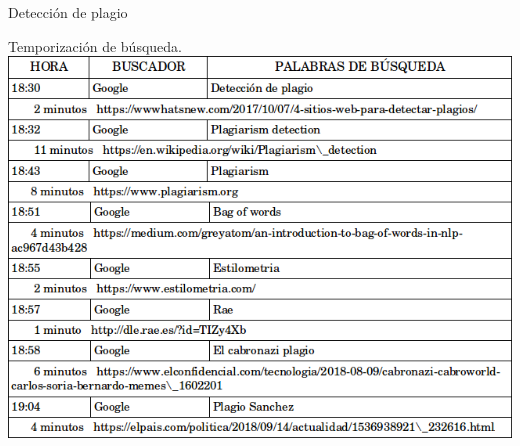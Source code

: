 \begin{section}{Detecci\'on de plagio}
		\begin{subsection}{Temporizaci\'on de b\'usqueda.}
			\includegraphics[width=1\textwidth]{plagio_tiempos.png}
		\end{subsection}
		
		
		
	\end{section}
	
	
	\newpage
	
	
	




















